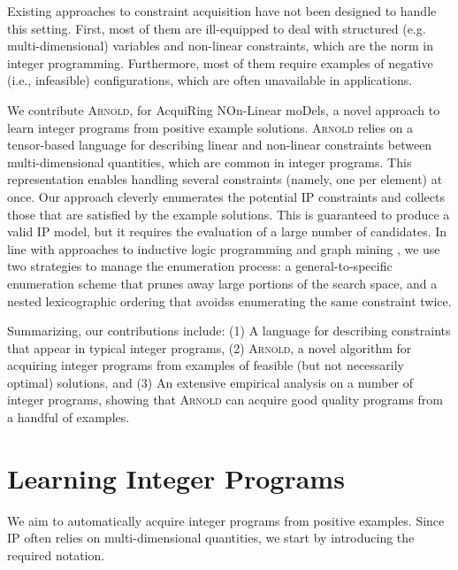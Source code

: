 \documentclass{article}
\newcommand{\learner}{\textsc{Arnold}\xspace}
\newcommand{\acronym}{AcquiRing NOn-Linear moDels}
\renewcommand\[{\begin{equation}}
\renewcommand\]{\end{equation}}
\begin{document}
Existing approaches to constraint acquisition have not been designed to handle
this setting.  First, most of them are ill-equipped to deal with
structured (e.g. multi-dimensional) variables and non-linear constraints, which
are the norm in integer programming.  Furthermore, most of them require
examples of negative (i.e., infeasible) configurations, which are often
unavailable in applications.

We contribute \learner, for \acronym, a novel approach to learn integer
programs from positive example solutions.
%
\learner relies on a tensor-based language for describing linear and non-linear
constraints between multi-dimensional quantities, which are common in integer
programs.  This representation enables handling several constraints (namely,
one per element) at once.
%
Our approach
cleverly enumerates
the potential IP constraints and collects those that are satisfied by the
example solutions.  This is guaranteed to produce a valid IP model, but it
requires the evaluation of a large number of candidates.
%
In line with approaches to inductive logic programming
\cite{de2008logical,de1997clausal} and graph mining
\cite{jiang_coenen_zito_2013}, we use two strategies to manage the enumeration
process:
%
a general-to-specific enumeration scheme that prunes away large portions of
the search space, and
%
a nested lexicographic ordering
that avoidss enumerating the same constraint twice.

Summarizing, our contributions include:
%
(1) A language for describing constraints that appear in typical integer
programs,
%
(2) \learner, a novel algorithm for acquiring integer programs from examples of
feasible (but not necessarily optimal) solutions, and
%
(3) An extensive empirical analysis on a number of integer programs, showing
that \learner can acquire good quality programs from a handful of examples.


\section{Learning Integer Programs}
\label{sec:ps}

We aim to automatically acquire integer programs from positive examples.  Since
IP often relies on multi-dimensional quantities, we start  by introducing the
required notation.
\end{document}
